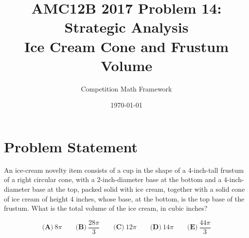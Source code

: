 \documentclass[]{article}
\begin{document}
\title{AMC12B 2017 Problem 14: Strategic Analysis\\
\large Ice Cream Cone and Frustum Volume}
\author{Competition Math Framework}
\date{\today}
\maketitle

\section*{Problem Statement}
An ice-cream novelty item consists of a cup in the shape of a 4-inch-tall frustum of a right circular cone, with a 2-inch-diameter base at the bottom and a 4-inch-diameter base at the top, packed solid with ice cream, together with a solid cone of ice cream of height 4 inches, whose base, at the bottom, is the top base of the frustum. What is the total volume of the ice cream, in cubic inches?

$$\textbf{(A)}\ 8\pi \qquad \textbf{(B)}\ \frac{28\pi}{3} \qquad \textbf{(C)}\ 12\pi \qquad \textbf{(D)}\ 14\pi \qquad \textbf{(E)}\ \frac{44\pi}{3}$$
\end{document}

